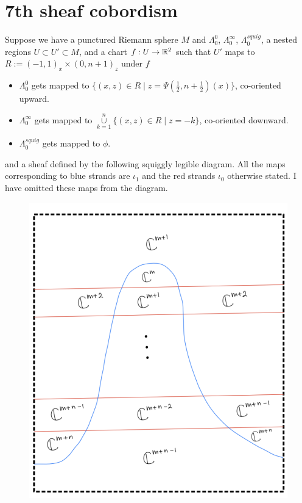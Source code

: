 \section{7th sheaf cobordism}
Suppose we have a punctured Riemann sphere $M$ and $\Lambda_0^0$, $\Lambda_0^\infty$, $\Lambda_0^{squig}$, a nested regions $U\subset U' \subset M$, and a chart $f : U \rightarrow \mathbb{R}^2$ such that $U'$ maps to $R:=(-1,1)_x \times (0,n+1)_z$ under $f$
\begin{itemize}
\item $\Lambda_0^0$ gets mapped to $\{(x,z)\in R \mid z=\Psi(\frac{1}{2},n+\frac{1}{2})(x)\}$, co-oriented upward.

\item $\Lambda_0^\infty$ gets mapped to $\overset{n}{\underset{k=1}{\cup}}\{(x,z)\in R \mid z=-k\}$, co-oriented downward.

\item $\Lambda_0^{squig}$ gets mapped to $\phi$.
\end{itemize}
and a sheaf defined by the following squiggly legible diagram. All the maps corresponding to blue strands are $\iota_1$ and the red strands $\iota_0$ otherwise stated. I have omitted these maps from the diagram.\\

\begin{figure}[H]
    \centering
    \includegraphics[scale = 0.95]{diagrams/cobord7/1.png}
    \caption{}
    \label{fig:your-label}
\end{figure}

